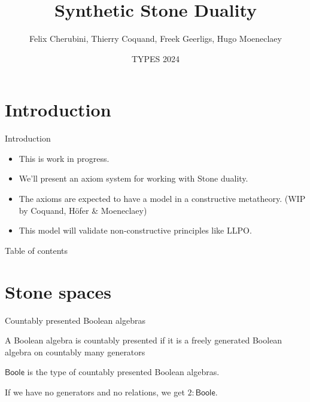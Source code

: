 \documentclass{beamer}
\newcommand{\Boole}{\mathsf{Boole}}
\newtheorem{remark}{Remark}
\begin{document}
\section{Introduction}

\title{Synthetic Stone Duality}
\date{TYPES 2024}
\author{
Felix Cherubini, Thierry Coquand, Freek Geerligs, Hugo Moeneclaey}
\maketitle
\begin{frame}{Introduction}
  \begin{itemize}
    \item This is work in progress. 
      \pause 
    \item We'll present an axiom system for working with Stone duality. 
      \pause 
    \item The axioms are expected to have a model in a constructive metatheory. 
      (WIP by Coquand, H\"ofer \& Moeneclaey)
      \pause
    \item 
      This model will validate non-constructive principles like LLPO. 
  \end{itemize}
\end{frame}
\begin{frame}{Table of contents}
\tableofcontents
\end{frame}

  \section{Stone spaces}%
\begin{frame}{Countably presented Boolean algebras}
  \begin{definition}
    A Boolean algebra is countably presented if it is a 
    \pause freely generated Boolean algebra on countably many generators
  \end{definition}
  \pause 
  \pause
  \begin{definition}
    $\Boole$ is the type of countably presented Boolean algebras. 
  \end{definition}
  \pause 
  \begin{example}
    If we have no generators and no relations, we get $2:\Boole$.
  \end{example}
\end{frame}
\end{document}
